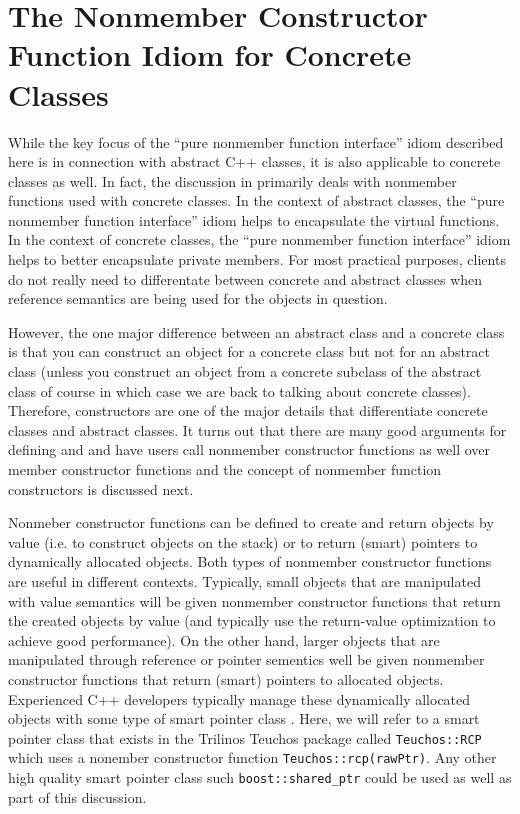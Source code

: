 \documentclass[pdf,ps2pdf,11pt]{SANDreport}
\begin{document}
%
\section{The Nonmember Constructor Function Idiom for Concrete Classes}
%

While the key focus of the ``pure nonmember function interface'' idiom
described here is in connection with abstract C++ classes, it is also
applicable to concrete classes as well.  In fact, the discussion in
{}\cite[Item 23]{EffectiveC++3rd} primarily deals with nonmember functions
used with concrete classes.  In the context of abstract classes, the ``pure
nonmember function interface'' idiom helps to encapsulate the virtual
functions.  In the context of concrete classes, the ``pure nonmember function
interface'' idiom helps to better encapsulate private members.  For most
practical purposes, clients do not really need to differentate between
concrete and abstract classes when reference semantics are being used for the
objects in question.

However, the one major difference between an abstract class and a concrete
class is that you can construct an object for a concrete class but not for an
abstract class (unless you construct an object from a concrete subclass of the
abstract class of course in which case we are back to talking about concrete
classes).  Therefore, constructors are one of the major details that
differentiate concrete classes and abstract classes.  It turns out that there
are many good arguments for defining and and have users call nonmember
constructor functions as well over member constructor functions and the
concept of nonmember function constructors is discussed next.

Nonmeber constructor functions can be defined to create and return objects by
value (i.e. to construct objects on the stack) or to return (smart) pointers
to dynamically allocated objects.  Both types of nonmember constructor
functions are useful in different contexts.  Typically, small objects that are
manipulated with value semantics will be given nonmember constructor functions
that return the created objects by value (and typically use the return-value
optimization to achieve good performance).  On the other hand, larger objects
that are manipulated through reference or pointer sementics well be given
nonmember constructor functions that return (smart) pointers to allocated
objects.  Experienced C++ developers typically manage these dynamically
allocated objects with some type of smart pointer class {}\cite[Item
13]{C++CodingStandards05}.  Here, we will refer to a smart pointer class that
exists in the Trilinos Teuchos package called {}\texttt{Teuchos\-::RCP}
{}\cite{RefCountPtrBeginnersGuide} which uses a nonember constructor function
{}\texttt{Teuchos\-::rcp(rawPtr)}.  Any other high quality smart pointer class
such {}\texttt{boost\-::shared\_ptr} could be used as well as part of this
discussion.
\end{document}
